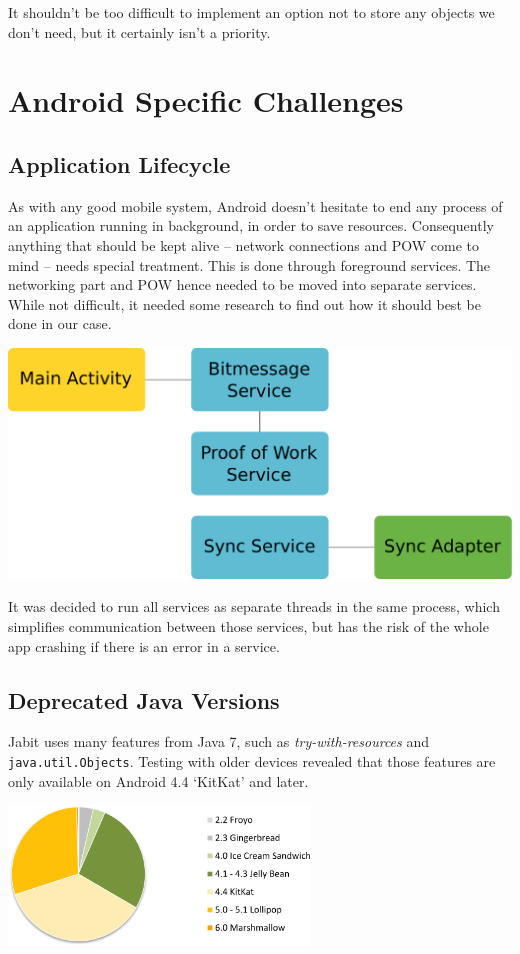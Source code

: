 \documentclass{bfh}
\begin{document}
  It shouldn't be too difficult to implement an option not to store any objects we don't need, but it certainly isn't a priority.


  \newpage
  \section{Android Specific Challenges}
  \subsection{Application Lifecycle}
  As with any good mobile system, Android doesn't hesitate to end any process of an application running in background, in order to save resources. Consequently anything that should be kept alive -- network connections and \ac{POW} come to mind -- needs special treatment. This is done through foreground services. The networking part and \ac{POW} hence needed to be moved into separate services. While not difficult, it needed some research to find out how it should best be done in our case.

  \begin{center}
    \includegraphics[width=0.8 \textwidth]{images/services.pdf}
  \end{center}

  It was decided to run all services as separate threads in the same process, which simplifies communication between those services, but has the risk of the whole app crashing if there is an error in a service.

  \subsection{Deprecated Java Versions}
  Jabit uses many features from Java 7, such as \textit{try-with-resources} and \texttt{java.util.Objects}. Testing with older devices revealed that those features are only available on Android 4.4 `KitKat' and later.

  \begin{center}
    \includegraphics[width=0.6\textwidth]{images/android_version_chart_dec_2015.png}
  \end{center}
\end{document}
